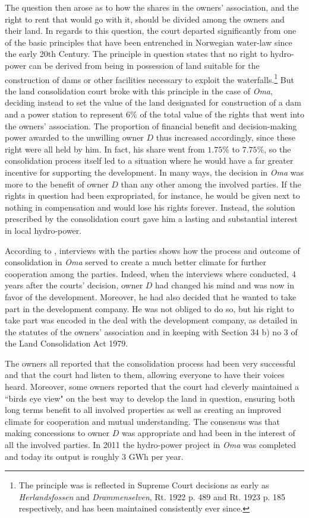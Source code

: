 \documentclass[10pt]{article} %
\begin{document}
The question then arose as to how the shares in the owners' association, and the right to rent that would go with it, should be divided among the owners and their land. In regards to this question, the court departed significantly from one of the basic principles that have been entrenched in Norwegian water-law since the early 20th Century. The principle in question states that no right to hydro-power can be derived from being in possession of land suitable for the construction of dams or other facilities necessary to exploit the waterfalls.\footnote{The principle was is reflected in Supreme Court decisions as early as \emph{Herlandsfossen} and \emph{Drammenselven}, Rt. 1922 p. 489 and Rt. 1923 p. 185 respectively, and has been maintained consistently ever since.} But the land consolidation court broke with this principle in the case of \emph{Oma}, deciding instead to set the value of the land designated for construction of a dam and a power station to represent $6 \%$ of the total value of the rights that went into the owners' association. The proportion of financial benefit and decision-making power awarded to the unwilling owner $D$ thus increased accordingly, since these right were all held by him. In fact, his share went from $1.75 \%$ to $7.75 \%$, so the consolidation process itself led to a situation where he would have a far greater incentive for supporting the development. In many ways, the decision in \emph{Oma} was more to the benefit of owner $D$ than any other among the involved parties. If the rights in question had been expropriated, for instance, he would be given next to nothing in compensation and would lose his rights forever. Instead, the solution prescribed by the consolidation court gave him a lasting and substantial interest in local hydro-power.

According to \cite{master}, interviews with the parties shows how the process and outcome of consolidation in \emph{Oma} served to create a much better climate for further cooperation among the parties. Indeed, when the interviews where conducted, 4 years after the courts' decision, owner $D$ had changed his mind and was now in favor of the development. Moreover, he had also decided that he wanted to take part in the development company. He was not obliged to do so, but his right to take part was encoded in the deal with the development company, as detailed in the statutes of the owners' association and in keeping with Section 34 b) no 3 of the Land Consolidation Act 1979.

The owners all reported that the consolidation process had been very successful and that the court had listen to them, allowing everyone to have their voices heard. Moreover, some owners reported that the court had cleverly maintained a ``birds eye view" on the best way to develop the land in question, ensuring both long terms benefit to all involved properties as well as creating an improved climate for cooperation and mutual understanding. The consensus was that making concessions to owner $D$ was appropriate and had been in the interest of all the involved parties. In 2011 the hydro-power project in \emph{Oma} was completed and today its output is roughly 3 GWh per year.
\end{document}
